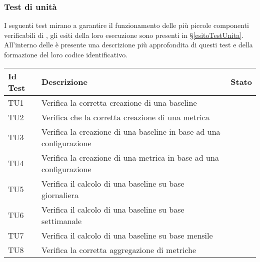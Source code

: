 \subsubsection{Test di unità}\label{testUnita}
	I seguenti test mirano a garantire il funzionamento delle più piccole componenti
	verificabili di \ProjectName{}, gli esiti della loro esecuzione sono presenti in §\ref{esitoTestUnita}.\\
	All'interno delle \vNormeDiProgetto{} è presente una descrizione più approfondita
	di questi test e della formazione del loro codice identificativo.	
	
	
	\begin{longtable}{  | >{\centering\arraybackslash}m{2.5cm} 
						| >{\raggedright\arraybackslash}m{9cm} 
						| >{\centering\arraybackslash}m{3.5cm} | }	
        	\hline
        		\textbf{Id Test} & \textbf{Descrizione} & \textbf{Stato} \\ \hline
        	\endhead
        					
				TU1 & Verifica la corretta creazione di una baseline
						& \donetext{} \\ \hline
				TU2 & Verifica che la corretta creazione di una metrica
						& \donetext{} \\ \hline
				TU3 & Verifica la creazione di una baseline in base ad una configurazione
						& \donetext{} \\ \hline
				TU4 & Verifica la creazione di una metrica in base ad una configurazione
						& \donetext{} \\ \hline
				TU5 & Verifica il calcolo di una baseline su base giornaliera
						& \donetext{} \\ \hline
				TU6 & Verifica il calcolo di una baseline su base settimanale
						& \donetext{} \\ \hline
				TU7 & Verifica il calcolo di una baseline su base mensile
						& \donetext{} \\ \hline
				TU8 & Verifica la corretta aggregazione di metriche
						& \donetext{} \\ \hline
						

\end{longtable}
